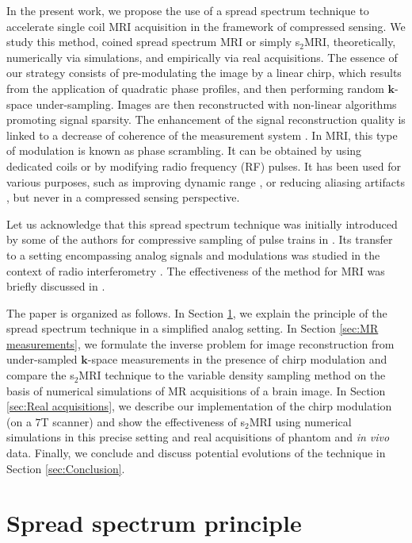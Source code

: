 \documentclass[10pt,draftcls, onecolumn]{IEEEtran}
\begin{document}
In the present work, we propose the use of a spread spectrum technique to accelerate single coil MRI acquisition in the framework of compressed sensing. We study this method, coined spread spectrum MRI or simply s$_2$MRI, theoretically, numerically via simulations, and empirically via real acquisitions. The essence of our strategy consists of pre-modulating the image by a linear chirp, which results from the application of quadratic phase profiles, and then performing random $\bm{k}$-space under-sampling. Images are then reconstructed with non-linear algorithms promoting signal sparsity. The enhancement of the signal reconstruction quality is linked to a decrease of coherence of the measurement system \cite{puy11a, wiaux09b}. In MRI, this type of modulation is known as phase scrambling. It can be obtained by using dedicated coils or by modifying radio frequency (RF) pulses. It has been used for various purposes, such as improving dynamic range \cite{maudsley88, wedeen88}, or reducing aliasing artifacts \cite{pipe95, ito08}, but never in a compressed sensing perspective.

Let us acknowledge that this spread spectrum technique was initially introduced by some of the authors for compressive sampling of pulse trains in \cite{naini09}. Its transfer to a setting encompassing analog signals and modulations was studied in the context of radio interferometry \cite{wiaux09b, wiaux09d, mcewen10}. The effectiveness of the method for MRI was briefly discussed in \cite{puy09, wiaux09c, puy11b}.

The paper is organized as follows. In Section \ref{sec:spread spectrum principle}, we explain the principle of the spread spectrum technique in a simplified analog setting. In Section \ref{sec:MR measurements}, we formulate the inverse problem for image reconstruction from under-sampled $\bm k$-space measurements in the presence of chirp modulation and compare the s$_2$MRI technique to the variable density sampling method on the basis of numerical simulations of MR acquisitions of a brain image. In Section \ref{sec:Real acquisitions}, we describe our implementation of the chirp modulation (on a $7$T scanner) and show the effectiveness of s$_2$MRI using numerical simulations in this precise setting and real acquisitions of phantom and \emph{in vivo} data. Finally, we conclude and discuss potential evolutions of the
technique in Section \ref{sec:Conclusion}.

\section{Spread spectrum principle}
\label{sec:spread spectrum principle}
\end{document}
